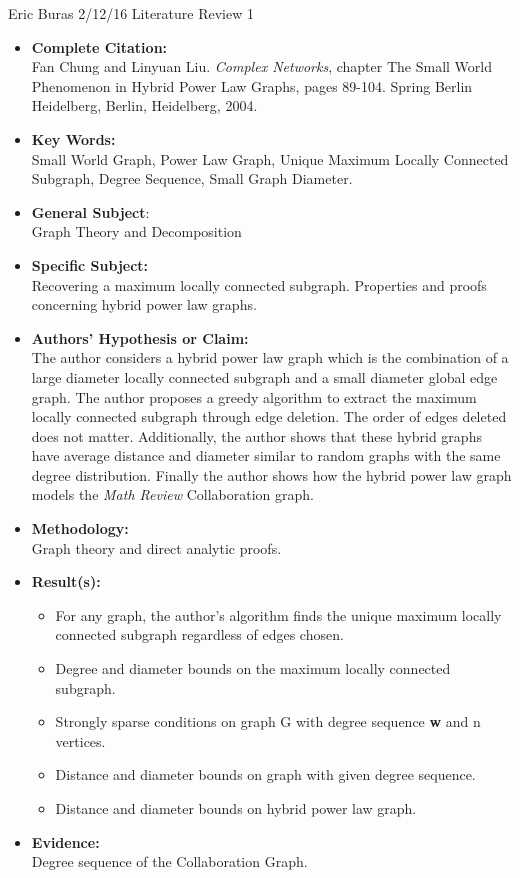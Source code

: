 \documentclass{article}
\begin{document}
Eric Buras 2/12/16 Literature Review 1
\\
\begin{itemize}
\setlength\itemsep{1em}
\item{\textbf{Complete Citation:}}
\\
Fan Chung and Linyuan Liu. \textit{Complex Networks}, chapter The Small World Phenomenon in Hybrid Power Law Graphs, pages 89-104. Spring Berlin Heidelberg, Berlin, Heidelberg, 2004.

\item{\textbf{Key Words:}} 
\\
Small World Graph, Power Law Graph, Unique Maximum Locally Connected Subgraph, Degree Sequence, Small Graph Diameter.
\item{\textbf{General Subject}:}
\\
Graph Theory and Decomposition

\item{\textbf{Specific Subject:}}
\\
Recovering a maximum locally connected subgraph. Properties and proofs concerning hybrid power law graphs.

\item{\textbf{Authors' Hypothesis or Claim:}}
\\
The author considers a hybrid power law graph which is the combination of a large diameter locally connected subgraph and a small diameter global edge graph. The author proposes a greedy algorithm to extract the maximum locally connected subgraph through edge deletion. The order of edges deleted does not matter. Additionally, the author shows that these hybrid graphs have average distance and diameter similar to random graphs with the same degree distribution. Finally the author shows how the hybrid power law graph models the \textit{Math Review} Collaboration graph.

\item{\textbf{Methodology:}}
\\
Graph theory and direct analytic proofs.

\item{\textbf{Result(s):}}
\\
\begin{itemize}
\item
For any graph, the author's algorithm finds the unique maximum locally connected subgraph regardless of edges chosen.
\item
Degree and diameter bounds on the maximum locally connected subgraph.
\item
Strongly sparse conditions on graph G with degree sequence \textbf{w} and n vertices.
\item
Distance and diameter bounds on graph with given degree sequence.
\item
Distance and diameter bounds on hybrid power law graph.
\end{itemize}
\item{\textbf{Evidence:}}
\\
Degree sequence of the Collaboration Graph.


\end{itemize}
\end{document}
